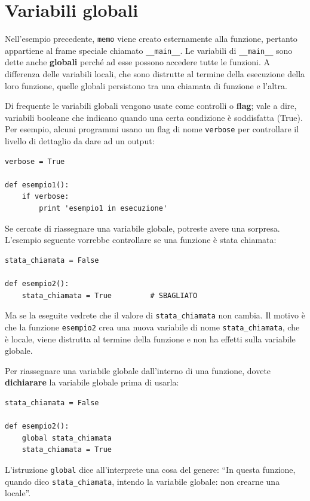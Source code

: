 \documentclass[10pt]{book}
\begin{document}
\section{Variabili globali}

Nell'esempio precedente, {\tt memo} viene creato esternamente alla funzione, pertanto appartiene al frame speciale chiamato \verb"__main__".
Le variabili di \verb"__main__" sono dette anche {\bf globali}
perché ad esse possono accedere tutte le funzioni. A differenza delle variabili locali, che sono distrutte al termine della esecuzione della loro funzione, quelle globali persistono tra una chiamata di funzione e l'altra.

Di frequente le variabili globali vengono usate come controlli o {\bf flag}; vale a dire, variabili booleane che indicano quando una certa condizione è soddisfatta (True). Per esempio, alcuni programmi usano un flag di nome {\tt verbose} per controllare il livello di dettaglio da dare ad un output:

\begin{verbatim}
verbose = True

def esempio1():
    if verbose:
        print 'esempio1 in esecuzione'
\end{verbatim}
%
Se cercate di riassegnare una variabile globale, potreste avere una sorpresa. L'esempio seguente vorrebbe controllare se una funzione è stata chiamata:

\begin{verbatim}
stata_chiamata = False

def esempio2():
    stata_chiamata = True         # SBAGLIATO
\end{verbatim}
%
Ma se la eseguite vedrete che il valore di \verb"stata_chiamata"
non cambia. Il motivo è che la funzione {\tt esempio2} crea una nuova variabile di nome \verb"stata_chiamata", che è locale, viene distrutta al termine della funzione e non ha effetti sulla variabile globale.

Per riassegnare una variabile globale dall'interno di una funzione, dovete
{\bf dichiarare} la variabile globale prima di usarla:

\begin{verbatim}
stata_chiamata = False

def esempio2():
    global stata_chiamata 
    stata_chiamata = True
\end{verbatim}
%
L'istruzione {\tt global} dice all'interprete una cosa del genere: ``In questa funzione, quando dico \verb"stata_chiamata", intendo la variabile globale: non crearne una locale''.
\end{document}
